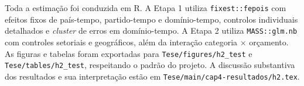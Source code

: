 Toda a estimação foi conduzida em R. A Etapa 1 utiliza \texttt{fixest::fepois} com efeitos fixos de país-tempo, partido-tempo e domínio-tempo, controlos individuais detalhados e \textit{cluster} de erros em domínio-tempo. A Etapa 2 utiliza \texttt{MASS::glm.nb} com controles setoriais e geográficos, além da interação categoria $\times$ orçamento. As figuras e tabelas foram exportadas para \texttt{Tese/figures/h2\_test} e \texttt{Tese/tables/h2\_test}, respeitando o padrão do projeto. A discussão substantiva dos resultados e sua interpretação estão em \texttt{Tese/main/cap4-resultados/h2.tex}.

